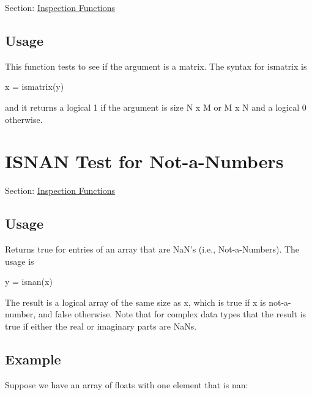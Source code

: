 Section\-: \hyperlink{sec_inspection}{Inspection Functions} \hypertarget{vtkwidgets_vtkxyplotwidget_Usage}{}\subsection{Usage}\label{vtkwidgets_vtkxyplotwidget_Usage}
This function tests to see if the argument is a matrix. The syntax for {\ttfamily ismatrix} is \begin{DoxyVerb}   x = ismatrix(y)
\end{DoxyVerb}
 and it returns a logical 1 if the argument is size {\ttfamily N x M} or {\ttfamily M x N} and a logical 0 otherwise. \hypertarget{inspection_isnan}{}\section{I\-S\-N\-A\-N Test for Not-\/a-\/\-Numbers}\label{inspection_isnan}
Section\-: \hyperlink{sec_inspection}{Inspection Functions} \hypertarget{vtkwidgets_vtkxyplotwidget_Usage}{}\subsection{Usage}\label{vtkwidgets_vtkxyplotwidget_Usage}
Returns true for entries of an array that are Na\-N's (i.\-e., Not-\/a-\/\-Numbers). The usage is \begin{DoxyVerb}   y = isnan(x)
\end{DoxyVerb}
 The result is a logical array of the same size as {\ttfamily x}, which is true if {\ttfamily x} is not-\/a-\/number, and false otherwise. Note that for complex data types that the result is true if either the real or imaginary parts are Na\-Ns. \hypertarget{variables_struct_Example}{}\subsection{Example}\label{variables_struct_Example}
Suppose we have an array of floats with one element that is {\ttfamily nan}\-:


